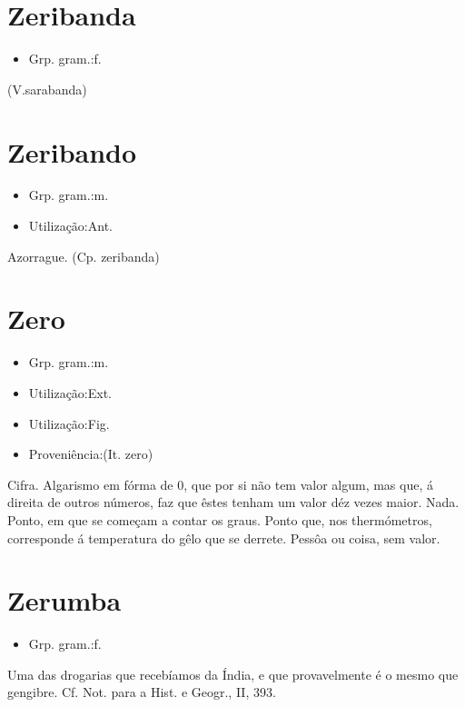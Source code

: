 \section{Zeribanda}
\begin{itemize}
\item {Grp. gram.:f.}
\end{itemize}
(V.sarabanda)
\section{Zeribando}
\begin{itemize}
\item {Grp. gram.:m.}
\end{itemize}
\begin{itemize}
\item {Utilização:Ant.}
\end{itemize}
Azorrague.
(Cp. \textunderscore zeribanda\textunderscore )
\section{Zero}
\begin{itemize}
\item {Grp. gram.:m.}
\end{itemize}
\begin{itemize}
\item {Utilização:Ext.}
\end{itemize}
\begin{itemize}
\item {Utilização:Fig.}
\end{itemize}
\begin{itemize}
\item {Proveniência:(It. \textunderscore zero\textunderscore )}
\end{itemize}
Cifra.
Algarismo em fórma de 0, que por si não tem valor algum, mas que, á direita de outros números, faz que êstes tenham um valor déz vezes maior.
Nada.
Ponto, em que se começam a contar os graus.
Ponto que, nos thermómetros, corresponde á temperatura do gêlo que se derrete.
Pessôa ou coisa, sem valor.
\section{Zerumba}
\begin{itemize}
\item {Grp. gram.:f.}
\end{itemize}
Uma das drogarias que recebíamos da Índia, e que provavelmente é o mesmo que \textunderscore gengibre\textunderscore . Cf. \textunderscore Not. para a Hist. e Geogr.\textunderscore , II, 393.
